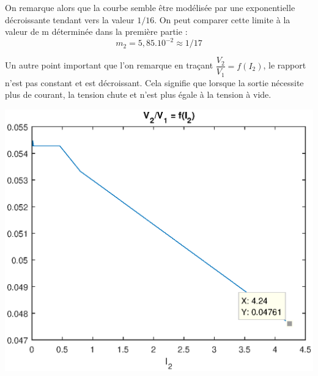 \documentclass[12pt,a4paper]{article}
\begin{document}
\begin{itemize}
		
		On remarque alors que la courbe semble être modélisée par une exponentielle décroissante tendant vers la valeur $1/16$.
		On peut comparer cette limite à la valeur de m déterminée dans la première partie :
		$$m_2=5,85.10^{-2}\approx1/17$$ 
		
		Un autre point important que l'on remarque en traçant $\dfrac{V_2}{V_1} =f(I_2)$, le rapport n'est pas constant et est décroissant. Cela signifie que lorsque la sortie nécessite plus de courant, la tension chute et n'est plus égale à la tension à vide.\\
		\begin{center}
			\includegraphics[width=0.8\linewidth]{res/chutetension}
		\end{center} 
	\end{itemize}
\end{document}
